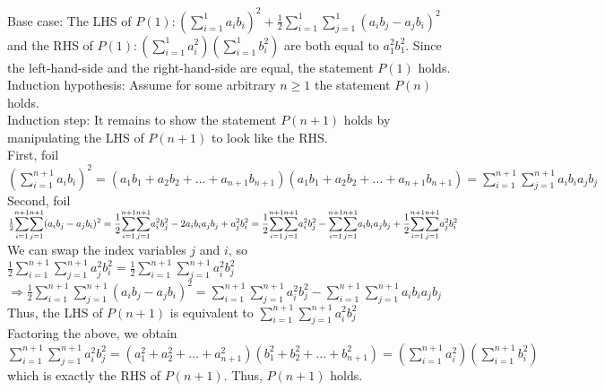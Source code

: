 \documentclass[10pt]{article}
\begin{document}
\begin{enumerate}[label=\bfseries Problem \arabic*:]
    Base case: The LHS of $P(1): (\displaystyle{\sum_{i=1}^{1}}a_ib_i)^2+\frac{1}{2}\displaystyle{\sum_{i=1}^{1}}\displaystyle{\sum_{j=1}^{1}}(a_ib_j-a_jb_i)^2$
    and the RHS of $P(1): (\displaystyle{\sum_{i=1}^{1}}a_{i}^2)(\displaystyle{\sum_{i=1}^{1}}b_{i}^2)$ are both equal to $a_{1}^{2}b_{1}^{2}$.
    Since the left-hand-side and the right-hand-side are equal, the statement $P(1)$ holds.\\
    Induction hypothesis: Assume for some arbitrary $n\ge1$ the statement $P(n)$ holds.\\
    Induction step: It remains to show the statement $P(n+1)$ holds by manipulating the LHS of $P(n+1)$ to look like the RHS.\\
    First, foil $(\displaystyle{\sum_{i=1}^{n+1}}a_ib_i)^2=(a_1b_1+a_2b_2+...+a_{n+1}b_{n+1})(a_1b_1+a_2b_2+...+a_{n+1}b_{n+1})=\displaystyle{\sum_{i=1}^{n+1}}\displaystyle{\sum_{j=1}^{n+1}}a_ib_ia_jb_j$\\
    Second, foil $\frac{1}{2}\displaystyle{\sum_{i=1}^{n+1}}\displaystyle{\sum_{j=1}^{n+1}}(a_ib_j-a_jb_i)^2\\
    =\frac{1}{2}\displaystyle{\sum_{i=1}^{n+1}}\displaystyle{\sum_{j=1}^{n+1}}a_{i}^{2}b_{j}^{2}-2a_ib_ia_jb_j+a_{j}^{2}b_{i}^{2}\\
    =\frac{1}{2}\displaystyle{\sum_{i=1}^{n+1}}\displaystyle{\sum_{j=1}^{n+1}}a_{i}^{2}b_{j}^{2}-\displaystyle{\sum_{i=1}^{n+1}}\displaystyle{\sum_{j=1}^{n+1}}a_ib_ia_jb_j+\frac{1}{2}\displaystyle{\sum_{i=1}^{n+1}}\displaystyle{\sum_{j=1}^{n+1}}a_{j}^{2}b_{i}^{2}$\\
    We can swap the index variables $j$ and $i$, so $\frac{1}{2}\displaystyle{\sum_{i=1}^{n+1}}\displaystyle{\sum_{j=1}^{n+1}}a_{j}^{2}b_{i}^{2}=\frac{1}{2}\displaystyle{\sum_{i=1}^{n+1}}\displaystyle{\sum_{j=1}^{n+1}}a_{i}^{2}b_{j}^{2}$\\
    $\Rightarrow \frac{1}{2}\displaystyle{\sum_{i=1}^{n+1}}\displaystyle{\sum_{j=1}^{n+1}}(a_ib_j-a_jb_i)^2= \displaystyle{\sum_{i=1}^{n+1}}\displaystyle{\sum_{j=1}^{n+1}}a_{i}^{2}b_{j}^{2}-\displaystyle{\sum_{i=1}^{n+1}}\displaystyle{\sum_{j=1}^{n+1}}a_ib_ia_jb_j$\\
    Thus, the LHS of $P(n+1)$ is equivalent to $\displaystyle{\sum_{i=1}^{n+1}}\displaystyle{\sum_{j=1}^{n+1}}a_{i}^{2}b_{j}^{2}$\\
    Factoring the above, we obtain $\displaystyle{\sum_{i=1}^{n+1}}\displaystyle{\sum_{j=1}^{n+1}}a_{i}^{2}b_{j}^{2}=(a_{1}^{2}+a_{2}^{2}+...+a_{n+1}^{2})(b_{1}^{2}+b_{2}^{2}+...+b_{n+1}^{2})=(\displaystyle{\sum_{i=1}^{n+1}}a_{i}^{2})(\displaystyle{\sum_{i=1}^{n+1}}b_{i}^{2})$ \\which is exactly the RHS of $P(n+1)$. Thus, $P(n+1)$ holds.\\

\end{enumerate}
\end{document}
